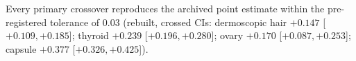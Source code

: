 Every primary crossover reproduces the archived point estimate within the pre-registered tolerance of 0.03 (rebuilt, crossed CIs: dermoscopic hair $+0.147$ [$+0.109, +0.185$]; thyroid $+0.239$ [$+0.196, +0.280$]; ovary $+0.170$ [$+0.087, +0.253$]; capsule $+0.377$ [$+0.326, +0.425$]).%
